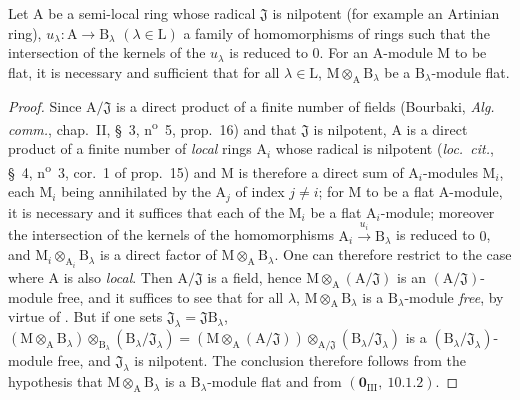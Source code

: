 \begin{corollary}[11.4.3]
\label{IV.11.4.3}
Let $\mathrm{A}$ be a semi-local ring whose radical $\mathfrak{J}$ is nilpotent (for
example an Artinian ring), $u_\lambda:\mathrm{A}\to\mathrm{B}_\lambda$ $(\lambda\in\mathrm{L})$ a family of homomorphisms of rings such
that the intersection of the kernels of the $u_\lambda$ is reduced to $0$. For an $\mathrm{A}$-module $\mathrm{M}$ to be flat, it is necessary and
sufficient that for all $\lambda\in\mathrm{L}$, $\mathrm{M}\otimes_\mathrm{A}\mathrm{B}_\lambda$ be a $\mathrm{B}_\lambda$-module flat.
\end{corollary}

\begin{proof}
Since $\mathrm{A}/\mathfrak{J}$ is a direct product of a finite number of fields (Bourbaki, \emph{Alg. comm.},
chap.~II, \S~3, n\textsuperscript{o}~5, prop.~16) and that $\mathfrak{J}$ is nilpotent, $\mathrm{A}$ is a direct product of a
finite number of \emph{local} rings $\mathrm{A}_i$ whose radical is nilpotent (\emph{loc.\ cit.}, \S~4, n\textsuperscript{o}~3, cor.~1
of prop.~15) and $\mathrm{M}$ is therefore a direct sum of $\mathrm{A}_i$-modules $\mathrm{M}_i$, each $\mathrm{M}_i$ being
annihilated by the $\mathrm{A}_j$ of index $j\neq i$; for $\mathrm{M}$ to be a flat $\mathrm{A}$-module, it is necessary and it
suffices that each of the $\mathrm{M}_i$ be a flat $\mathrm{A}_i$-module; moreover the intersection of the kernels
of the homomorphisms $\mathrm{A}_i\xrightarrow{u_i}\mathrm{B}_\lambda$ is reduced to $0$, and $\mathrm{M}_i\otimes_{\mathrm{A}_i}\mathrm{B}_\lambda$ is a direct factor
of $\mathrm{M}\otimes_\mathrm{A}\mathrm{B}_\lambda$. One can therefore restrict to the case where $\mathrm{A}$ is also \emph{local}. Then $\mathrm{A}/\mathfrak{J}$ is a
field, hence $\mathrm{M}\otimes_\mathrm{A}(\mathrm{A}/\mathfrak{J})$ is an $(\mathrm{A}/\mathfrak{J})$-module free, and it suffices to see that for
all $\lambda$, $\mathrm{M}\otimes_\mathrm{A}\mathrm{B}_\lambda$ is a $\mathrm{B}_\lambda$-module \emph{free}, by virtue of . But if one sets $\mathfrak{J}_\lambda=\mathfrak{J}\mathrm{B}_\lambda$,
$(\mathrm{M}\otimes_\mathrm{A}\mathrm{B}_\lambda)\otimes_{\mathrm{B}_\lambda}(\mathrm{B}_\lambda/\mathfrak{J}_\lambda)=(\mathrm{M}\otimes_\mathrm{A}(\mathrm{A}/\mathfrak{J}))\otimes_{\mathrm{A}/\mathfrak{J}}(\mathrm{B}_\lambda/\mathfrak{J}_\lambda)$ is a $(\mathrm{B}_\lambda/\mathfrak{J}_\lambda)$-module free, and $\mathfrak{J}_\lambda$ is
nilpotent. The conclusion therefore follows from the hypothesis that $\mathrm{M}\otimes_\mathrm{A}\mathrm{B}_\lambda$ is a $\mathrm{B}_\lambda$-module
flat and from $(\mathbf{0}_{\mathrm{III}},~10.1.2)$.
\end{proof}

